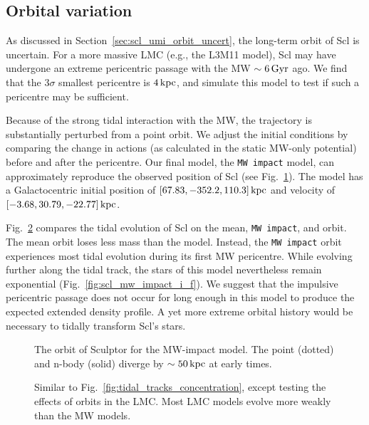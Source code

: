 \subsection{Orbital variation}\label{orbital-variation}

As discussed in Section~\ref{sec:scl_umi_orbit_uncert}, the long-term
orbit of Scl is uncertain. For a more massive LMC (e.g., the L3M11
model), Scl may have undergone an extreme pericentric passage with the
MW \(\sim 6\,{\rm Gyr}\) ago. We find that the 3\(\sigma\) smallest
pericentre is \(4\,{\rm kpc}\), and simulate this model to test if such a
pericentre may be sufficient.

Because of the strong tidal interaction with the MW, the trajectory is
substantially perturbed from a point orbit. We adjust the initial
conditions by comparing the change in actions (as calculated in the
static MW-only potential) before and after the pericentre. Our final
model, the \texttt{MW\ impact} model, can approximately reproduce the
observed position of Scl (see Fig.~\ref{fig:scl_mw_impact_orbit}). The
model has a Galactocentric initial position of
\([67.83, -352.2, 110.3]\,{\rm kpc}\) and velocity of
\([-3.68, 30.79, -22.77]\,{\rm kpc}\).

Fig.~\ref{fig:tidal_tracks_umi} compares the tidal evolution of Scl on
the mean, \texttt{MW\ impact}, and \smallperi{} orbit. The mean orbit
loses less mass than the \smallperi{} model. Instead, the
\texttt{MW\ impact} orbit experiences most tidal evolution during its
first MW pericentre. While evolving further along the tidal track, the
stars of this model nevertheless remain exponential
(Fig.~\ref{fig:scl_mw_impact_i_f}). We suggest that the impulsive
pericentric passage does not occur for long enough in this model to
produce the expected extended density profile. A yet more extreme
orbital history would be necessary to tidally transform Scl's stars.

\begin{figure}
\centering
{}
\caption[Sculptor MW impact orbit]{The orbit of Sculptor for the
MW-impact model. The point (dotted) and n-body (solid) diverge by
\(\sim 50\,{\rm kpc}\) at early times.}\label{fig:scl_mw_impact_orbit}
\end{figure}

\begin{figure}
\centering
{}
\caption[Sculptor's tidal evolution for different orbits]{Similar to
Fig.~\ref{fig:tidal_tracks_concentration}, except testing the effects of
orbits in the LMC. Most LMC models evolve more weakly than the MW
models.}\label{fig:tidal_tracks_umi}
\end{figure}

